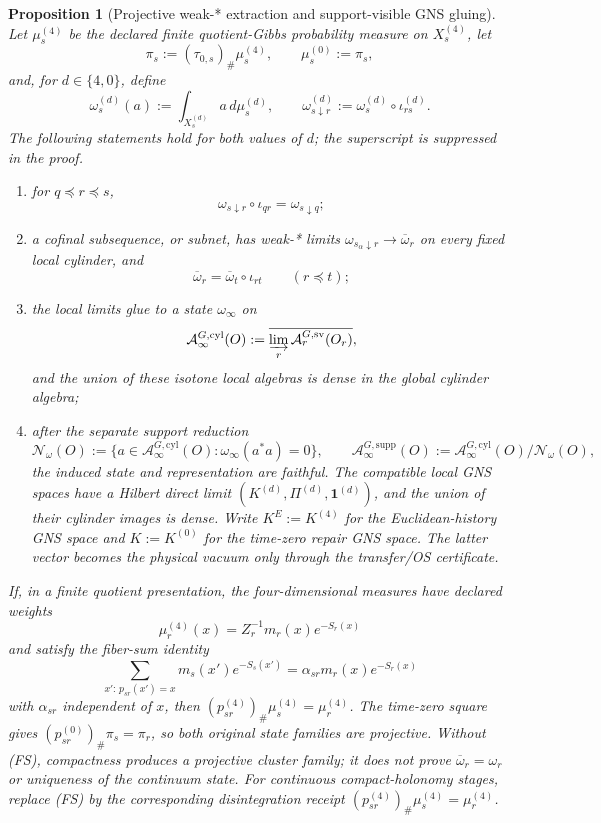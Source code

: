 \documentclass[11pt]{article}
\numberwithin{equation}{section}
\newtheorem{proposition}[theorem]{Proposition}
\theoremstyle{remark}
\begin{document}
\begin{proposition}[Projective weak-* extraction and support-visible GNS gluing]
\label{prop:extraction}
Let \(\mu_s^{(4)}\) be the declared finite quotient-Gibbs probability measure on \(X_s^{(4)}\),
let
\[
\pi_s:=(\tau_{0,s})_\#\mu_s^{(4)},
\qquad
\mu_s^{(0)}:=\pi_s,
\]
and, for \(d\in\{4,0\}\), define
\[
\omega_s^{(d)}(a):=\int_{X_s^{(d)}}a\,d\mu_s^{(d)},
\qquad
\omega_{s\downarrow r}^{(d)}
:=\omega_s^{(d)}\circ\iota_{rs}^{(d)}.
\]
The following statements hold for both values of \(d\); the superscript is suppressed in the
proof.
\begin{enumerate}[label=\textup{(\roman*)},leftmargin=2em]
\item for \(q\preceq r\preceq s\),
\[
\omega_{s\downarrow r}\circ\iota_{qr}=\omega_{s\downarrow q};
\]
\item a cofinal subsequence, or subnet, has weak-* limits
\(\omega_{s_\alpha\downarrow r}\to\overline\omega_r\) on every fixed local cylinder, and
\[
\overline\omega_r=\overline\omega_t\circ\iota_{rt}
\qquad(r\preceq t);
\]
\item the local limits glue to a state \(\omega_\infty\) on
\[
\mathcal A_\infty^{G,\mathrm{cyl}}(O)
:=\overline{\varinjlim_r\mathcal A_r^{G,\mathrm{sv}}(O_r)},
\]
and the union of these isotone local algebras is dense in the global cylinder algebra;
\item after the separate support reduction
\[
\mathcal N_\omega(O):=\{a\in\mathcal A_\infty^{G,\mathrm{cyl}}(O):
\omega_\infty(a^*a)=0\},
\qquad
\mathcal A_\infty^{G,\mathrm{supp}}(O)
:=\mathcal A_\infty^{G,\mathrm{cyl}}(O)/\mathcal N_\omega(O),
\]
the induced state and representation are faithful. The compatible local GNS spaces have a Hilbert
direct limit \((K^{(d)},\Pi^{(d)},\mathbf 1^{(d)})\), and the union of their cylinder images is
dense. Write \(K^E:=K^{(4)}\) for the Euclidean-history GNS space and \(K:=K^{(0)}\) for the
time-zero repair GNS space. The latter vector becomes the physical vacuum only through the
transfer/OS certificate.
\end{enumerate}
If, in a finite quotient presentation, the four-dimensional measures have declared weights
\[
\mu_r^{(4)}(x)=Z_r^{-1}m_r(x)e^{-S_r(x)}
\]
and satisfy the fiber-sum identity
\[
\sum_{x':\,p_{sr}(x')=x}m_s(x')e^{-S_s(x')}
=\alpha_{sr}m_r(x)e^{-S_r(x)}
\tag{FS}
\]
with \(\alpha_{sr}\) independent of \(x\), then
\((p_{sr}^{(4)})_\#\mu_s^{(4)}=\mu_r^{(4)}\). The time-zero square gives
\((p_{sr}^{(0)})_\#\pi_s=\pi_r\), so both original state families are projective. Without
(FS), compactness produces a projective cluster family; it does not prove
\(\overline\omega_r=\omega_r\) or uniqueness of the continuum state. For continuous
compact-holonomy stages, replace (FS) by the corresponding disintegration receipt
\((p_{sr}^{(4)})_\#\mu_s^{(4)}=\mu_r^{(4)}\).
\end{proposition}
\end{document}
